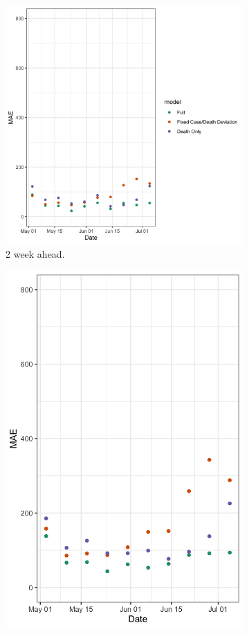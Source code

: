\documentclass{umassthesis}          %
\begin{document}
\begin{figure}
\begin{subfigure}{.5\textwidth}
    \includegraphics[scale=.15]{ablation_2.png}
    \caption{2 week ahead.}
\end{subfigure}
\begin{subfigure}{.5\textwidth}
  \centering
    \includegraphics[scale=.15]{ablation_3.png}

\end{subfigure}
\end{figure}
\end{document}
